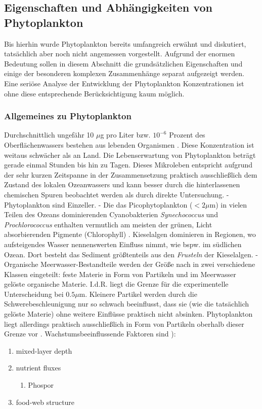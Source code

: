 \documentclass[12pt,a4paper,onecolumn]{scrartcl}
\begin{document}
\subsection{Eigenschaften und Abhängigkeiten von Phytoplankton} \label{sec:Phytoplankton}
Bis hierhin wurde Phytoplankton bereits umfangreich erwähnt und diskutiert, tatsächlich aber noch nicht angemessen vorgestellt. Aufgrund der enormen Bedeutung sollen in diesem Abschnitt die grundsätzlichen Eigenschaften und einige der besonderen komplexen Zusammenhänge separat aufgezeigt werden. Eine seriöse Analyse der Entwicklung der Phytoplankton Konzentrationen ist ohne diese entsprechende Berücksichtigung kaum möglich.
\subsubsection{Allgemeines zu Phytoplankton} \label{sec:Phytobasics}
Durchschnittlich ungefähr 10 $\mu$g pro Liter bzw. $10^{-6}$ Prozent des Oberflächenwassers bestehen aus lebenden Organismen \citep{Emerson.2009}. Diese Konzentration ist weitaus schwächer als an Land. Die Lebenserwartung von Phytoplankton beträgt gerade einmal Stunden bis hin zu Tagen. Dieses Mikroleben entspricht aufgrund der sehr kurzen Zeitspanne in der Zusammensetzung praktisch ausschließlich dem Zustand des lokalen Ozeanwassers und kann besser durch die hinterlassenen chemischen Spuren beobachtet werden als durch direkte Untersuchung. - Phytoplankton sind Einzeller. - Die das Picophytoplankton ($<2\mu$m) in vielen Teilen des Ozeans dominierenden Cyanobakterien \textit{Synechococcus}  und \textit{Prochlorococcus} enthalten vermutlich am meisten der grünen, Licht absorbierenden Pigmente (Chlorophyll) \citep{Emerson.2009}. Kieselalgen dominieren in Regionen, wo aufsteigendes Wasser nennenswerten Einfluss nimmt, wie bspw. im südlichen Ozean. Dort besteht das Sediment größtenteils aus den \textit{Frusteln} der Kieselalgen. - Organische Meerwasser-Bestandteile werden der Größe nach in zwei verschiedene Klassen eingeteilt: feste Materie in Form von Partikeln und im Meerwasser  gelöste organische Materie. I.d.R. liegt die Grenze für die experimentelle Unterscheidung bei $0.5 \mu$m. Kleinere Partikel werden durch die Schwerebeschleunigung nur so schwach beeinflusst, dass sie (wie die tatsächlich gelöste Materie) ohne weitere Einflüsse praktisch nicht absinken. Phytoplankton liegt allerdings praktisch ausschließlich in Form von Partikeln oberhalb dieser Grenze vor \citep{Emerson.2009}.
Wachstumsbeeinflussende Faktoren sind \citep{Falkowski.1998}):
\begin{enumerate}
\item mixed-layer depth
\item nutrient fluxes
\begin{enumerate}
\item Phospor \citep{REDFIELD.1960}
\end{enumerate}
\item food-web structure
\end{enumerate}
\end{document}
